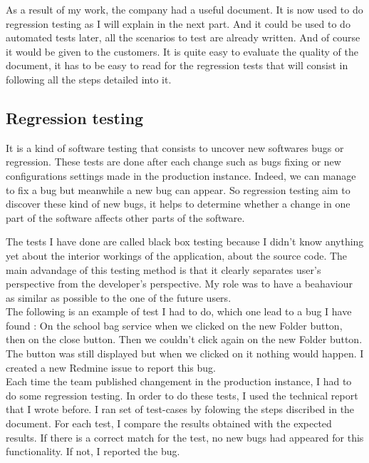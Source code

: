 As a result of my work, the company had a useful document. It is now used to do regression
testing as I will explain in the next part. And it could be used to do automated tests later,
 all the scenarios to test are already written. And of course it would be given to the customers.
It is quite easy to evaluate the quality of the document, it has to be easy to read for
the regression tests that will consist in following all the steps detailed into it.\\


\subsection{Regression testing}
It is a kind of software testing that consists to uncover new softwares bugs
or regression. These tests are done after each change such as bugs fixing or new
 configurations settings made in the production instance. 
 Indeed, we can manage to fix a bug but 
meanwhile a new bug can appear. So regression testing aim to discover these
kind of new bugs, it helps to determine whether a change in one part of the
 software affects other parts of the software. 
 
 The tests I have done are called black box testing because I didn't know anything yet about
 the interior workings of the application, about the source code. The main advandage of this 
 testing method is that it clearly separates user's perspective from the developer's
 perspective. My role was to have a beahaviour as similar as possible to the one of 
 the future users.\\

The following is an example of test I had to do, which one lead to a bug I have found : 
On the school bag service when we clicked on the new Folder button, then on the close button. 
Then we couldn't click again on the new Folder button. The button was still displayed
 but when we clicked on it nothing would happen. I created a new Redmine issue to 
 report this bug.\\

Each time the team published changement in the production instance, I had to do some
regression testing. In order to do these tests, I used the technical report that I wrote
before. I ran set of test-cases by folowing the steps discribed in the document. 
For each test, I compare the results obtained with the expected results. 
If there is a correct match for the test, no new bugs had appeared for this functionality.
 If not, I reported the bug. 
 
